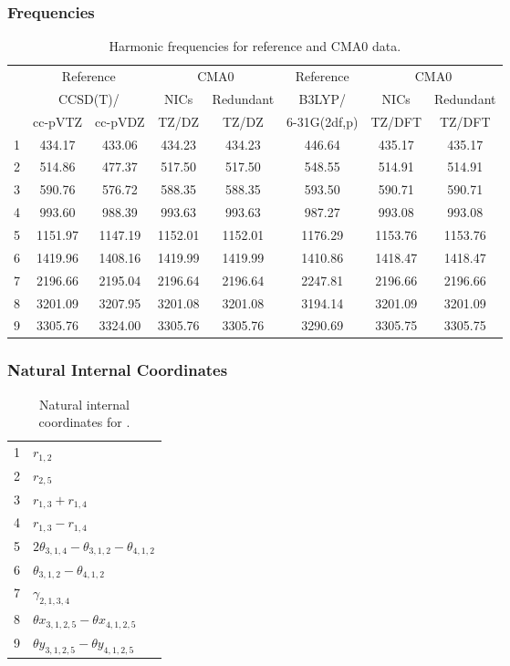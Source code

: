 \documentclass[10pt,oneside]{article}
\begin{document}
\begin{table}[h!]
\subsubsection*{Frequencies}
\centering
\caption{Harmonic frequencies for reference and CMA0 data.}
\begin{tabular}{cccccccc}
\toprule
{} & \multicolumn{2}{c}{Reference} & \multicolumn{2}{c}{CMA0} &    Reference & \multicolumn{2}{c}{CMA0} \\
{} & \multicolumn{2}{c}{CCSD(T)/} &    NICs &  Redundant &       B3LYP/ &    NICs & Redundant \\
{} &   cc-pVTZ & cc-pVDZ &   TZ/DZ &      TZ/DZ & 6-31G(2df,p) &  TZ/DFT &    TZ/DFT \\
\midrule
1 &    434.17 &  433.06 &  434.23 &     434.23 &       446.64 &  435.17 &    435.17 \\
2 &    514.86 &  477.37 &  517.50 &     517.50 &       548.55 &  514.91 &    514.91 \\
3 &    590.76 &  576.72 &  588.35 &     588.35 &       593.50 &  590.71 &    590.71 \\
4 &    993.60 &  988.39 &  993.63 &     993.63 &       987.27 &  993.08 &    993.08 \\
5 &   1151.97 & 1147.19 & 1152.01 &    1152.01 &      1176.29 & 1153.76 &   1153.76 \\
6 &   1419.96 & 1408.16 & 1419.99 &    1419.99 &      1410.86 & 1418.47 &   1418.47 \\
7 &   2196.66 & 2195.04 & 2196.64 &    2196.64 &      2247.81 & 2196.66 &   2196.66 \\
8 &   3201.09 & 3207.95 & 3201.08 &    3201.08 &      3194.14 & 3201.09 &   3201.09 \\
9 &   3305.76 & 3324.00 & 3305.76 &    3305.76 &      3290.69 & 3305.75 &   3305.75 \\
\bottomrule
\end{tabular}
\end{table}

\begin{table}[h!]
\subsubsection*{Natural Internal Coordinates}
\centering
\caption{Natural internal coordinates for .}
\small
\begin{tabular}{ll}
\toprule
  1   & $r_{1,2}$ \\
  2   & $r_{2,5}$ \\
  3   & $r_{1,3} + r_{1,4}$ \\
  4   & $r_{1,3} - r_{1,4}$ \\
  5   & $2\theta_{3,1,4} - \theta_{3,1,2} - \theta_{4,1,2}$ \\
  6   & $\theta_{3,1,2} - \theta_{4,1,2}$ \\
  7   & $\gamma_{2,1,3,4}$ \\
  8   & $\theta x_{3,1,2,5} - \theta x_{4,1,2,5}$ \\
  9   & $\theta y_{3,1,2,5} - \theta y_{4,1,2,5}$ \\
\bottomrule
\end{tabular}
\end{table}
\end{document}
